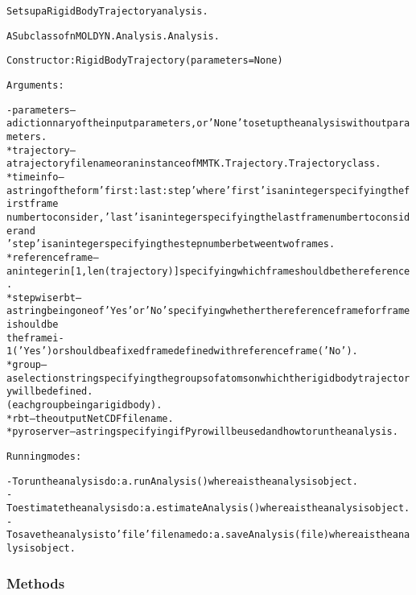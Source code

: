 \begin{alltt}
Sets up a Rigid Body Trajectory analysis.

A Subclass of nMOLDYN.Analysis.Analysis. 

Constructor: RigidBodyTrajectory({\textbar}parameters{\textbar} = None)

Arguments:

    - {\textbar}parameters{\textbar} -- a dictionnary of the input parameters, or 'None' to set up the analysis without parameters.
        * trajectory     -- a trajectory file name or an instance of MMTK.Trajectory.Trajectory class.
        * timeinfo       -- a string of the form 'first:last:step' where 'first' is an integer specifying the first frame 
                            number to consider, 'last' is an integer specifying the last frame number to consider and 
                            'step' is an integer specifying the step number between two frames.
        * referenceframe -- an integer in [1,len(trajectory)] specifying which frame should be the reference.
        * stepwiserbt    -- a string being one of 'Yes' or 'No' specifying whether the reference frame for frame i should be 
                            the frame i - 1 ('Yes') or should be a fixed frame defined with {\textbar}referenceframe{\textbar} ('No').
        * group          -- a selection string specifying the groups of atoms on which the rigid body trajectory will be defined.
                            (each group being a rigid body).
        * rbt            -- the output NetCDF file name.
        * pyroserver     -- a string specifying if Pyro will be used and how to run the analysis.
    
Running modes:

    - To run the analysis do: a.runAnalysis() where a is the analysis object.
    - To estimate the analysis do: a.estimateAnalysis() where a is the analysis object.
    - To save the analysis to 'file' file name do: a.saveAnalysis(file) where a is the analysis object.
\end{alltt}



  \subsubsection{Methods}


